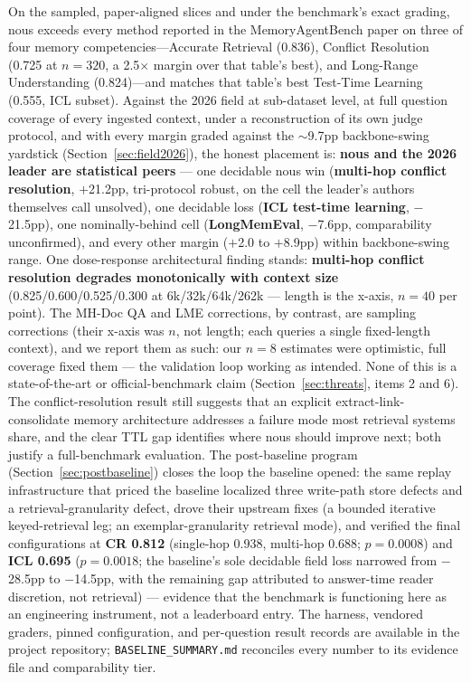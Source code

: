 \documentclass{article}
\newcommand{\nous}{\textsf{nous}}
\newcommand{\mab}{MemoryAgentBench}
\begin{document}
On the sampled, paper-aligned slices and under the benchmark's exact grading,
\nous{} exceeds every method reported in the \mab{} paper on three of four
memory competencies---Accurate Retrieval (0.836), Conflict Resolution (0.725
at $n{=}320$, a 2.5$\times$ margin over that table's best), and Long-Range
Understanding (0.824)---and matches that table's best Test-Time Learning
(0.555, ICL subset). Against the 2026 field at sub-dataset level, at full
question coverage of every ingested context, under a reconstruction of its
own judge protocol, and with every margin graded against the $\sim$9.7pp
backbone-swing yardstick (Section~\ref{sec:field2026}), the honest placement
is: \textbf{\nous{} and the 2026 leader are statistical peers} --- one
decidable \nous{} win (\textbf{multi-hop conflict resolution}, $+$21.2pp,
tri-protocol robust, on the cell the leader's authors themselves call
unsolved), one decidable loss (\textbf{ICL test-time learning}, $-$21.5pp),
one nominally-behind cell (\textbf{LongMemEval}, $-$7.6pp, comparability
unconfirmed), and every other margin ($+$2.0 to $+$8.9pp) within
backbone-swing range. One dose-response architectural finding stands:
\textbf{multi-hop conflict resolution degrades monotonically with context
size} (0.825/0.600/0.525/0.300 at 6k/32k/64k/262k --- length is the x-axis,
$n{=}40$ per point). The MH-Doc QA and LME corrections, by contrast, are
sampling corrections (their x-axis was $n$, not length; each queries a
single fixed-length context), and we report them as such: our $n{=}8$
estimates were optimistic, full coverage fixed them --- the validation loop
working as intended.
None of this is a state-of-the-art or official-benchmark claim
(Section~\ref{sec:threats}, items 2 and 6). The
conflict-resolution result still suggests that an explicit
extract-link-consolidate memory architecture addresses a failure mode most
retrieval systems share, and the clear TTL gap identifies where \nous{}
should improve next; both justify a full-benchmark evaluation. The
post-baseline program (Section~\ref{sec:postbaseline}) closes the loop the
baseline opened: the same replay infrastructure that priced the baseline
localized three write-path store defects and a retrieval-granularity defect,
drove their upstream fixes (a bounded iterative keyed-retrieval leg; an
exemplar-granularity retrieval mode), and verified the final configurations
at \textbf{CR 0.812} (single-hop 0.938, multi-hop 0.688; $p{=}0.0008$) and
\textbf{ICL 0.695} ($p{=}0.0018$; the baseline's sole decidable field loss
narrowed from $-$28.5pp to $-$14.5pp, with the remaining gap attributed to
answer-time reader discretion, not retrieval) --- evidence that the
benchmark is functioning here as an engineering instrument, not a
leaderboard entry. The harness,
vendored graders, pinned configuration, and per-question result records are
available in the project repository; \texttt{BASELINE\_SUMMARY.md} reconciles
every number to its evidence file and comparability tier.
\end{document}
